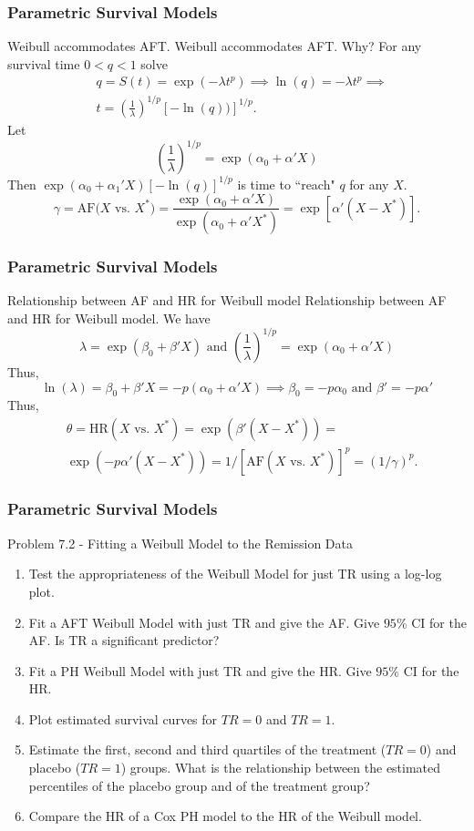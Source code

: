 \documentclass{beamer}
\theoremstyle{definition}
\begin{document}
\begin{frame}
\frametitle{Parametric Survival Models}
\begin{block}{Weibull accommodates AFT.}
Weibull accommodates AFT. Why? For any survival time $0 < q < 1$ solve
\begin{align*}
& q = S(t) =  \exp(-\lambda t^p) \implies \ln(q) = - \lambda t^p \implies \\
& t = \left(\frac{1}{\lambda}\right)^{1/p} [- \ln(q))]^{1/p}.
\end{align*}
Let
\[
\left(\frac{1}{\lambda}\right)^{1/p} = \exp(\alpha_0 + \alpha'X)
\]
Then $\exp(\alpha_0 + \alpha_1'X)[- \ln(q)]^{1/p}$ is time to ``reach" $q$ for any $X$.
\vspace{-10pt}
\[
\gamma = \text{AF($X$ vs. $X^*$)} = \frac{\exp(\alpha_0 + \alpha'X)}{\exp(\alpha_0 + \alpha'X^*)} = \exp[\alpha'(X-X^*)].
\]
\end{block}
\end{frame}

\begin{frame}
\frametitle{Parametric Survival Models}
\begin{block}{Relationship between AF and HR for Weibull model}
Relationship between AF and HR for Weibull model. We have
\[
\lambda = \exp(\beta_0 + \beta'X) \text{ and } \left(\frac{1}{\lambda}\right)^{1/p} = \exp(\alpha_0 + \alpha'X)
\]
Thus,
\[ \ln(\lambda) = \beta_0 + \beta'X = -p(\alpha_0 + \alpha'X) \implies \beta_0 = -p\alpha_0 \text{ and } \beta'=-p\alpha' \]
Thus,
\begin{align*}
&\theta = \text{HR}(X \text{ vs. } X^*) = \exp(\beta'(X - X^*)) =\\
&\exp(-p\alpha'(X - X^*)) = 1/[\text{AF}(X \text{ vs. } X^*)]^p = (1/\gamma)^p.
\end{align*}
\end{block}
\end{frame}

\begin{frame}
\frametitle{Parametric Survival Models}
\begin{block}{Problem 7.2 - Fitting a Weibull Model to the Remission Data}
\begin{enumerate}
\item Test the appropriateness of the Weibull Model for just TR using a log-log plot.
\item Fit a AFT Weibull Model with just TR and give the AF. Give $95\%$ CI for the AF. Is TR a significant predictor?
\item Fit a PH  Weibull Model with just TR and give the HR. Give $95\%$ CI for the HR.
\item Plot estimated survival curves for $TR=0$ and $TR=1$.
\item Estimate the first, second and third quartiles of the treatment ($TR=0$) and placebo ($TR=1$) groups. What is the relationship between the estimated percentiles of the placebo group and of the treatment group? 
\item Compare the HR of a Cox PH model to the HR of the Weibull model. 
\end{enumerate}
\end{block}
\end{frame}
\end{document}
